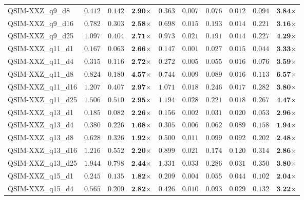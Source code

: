 \begin{table*}[t]
{\begin{tabular}{| l || r r c || r r r r r c |}
QSIM-XXZ\_q9\_d8 & $0.412$ & $0.142$ & $\textbf{2.90}$$\times$ & $0.363$ & $0.007$ & $0.076$ & $0.012$ & $0.094$ & $\textbf{3.84}$$\times$ \\
QSIM-XXZ\_q9\_d16 & $0.782$ & $0.303$ & $\textbf{2.58}$$\times$ & $0.698$ & $0.015$ & $0.193$ & $0.014$ & $0.221$ & $\textbf{3.16}$$\times$ \\
QSIM-XXZ\_q9\_d25 & $1.097$ & $0.404$ & $\textbf{2.71}$$\times$ & $0.973$ & $0.021$ & $0.191$ & $0.014$ & $0.227$ & $\textbf{4.29}$$\times$ \\
QSIM-XXZ\_q11\_d1 & $0.167$ & $0.063$ & $\textbf{2.66}$$\times$ & $0.147$ & $0.001$ & $0.027$ & $0.015$ & $0.044$ & $\textbf{3.33}$$\times$ \\
QSIM-XXZ\_q11\_d4 & $0.315$ & $0.116$ & $\textbf{2.72}$$\times$ & $0.272$ & $0.005$ & $0.055$ & $0.016$ & $0.076$ & $\textbf{3.59}$$\times$ \\
QSIM-XXZ\_q11\_d8 & $0.824$ & $0.180$ & $\textbf{4.57}$$\times$ & $0.744$ & $0.009$ & $0.089$ & $0.016$ & $0.113$ & $\textbf{6.57}$$\times$ \\
QSIM-XXZ\_q11\_d16 & $1.207$ & $0.407$ & $\textbf{2.97}$$\times$ & $1.071$ & $0.018$ & $0.246$ & $0.017$ & $0.282$ & $\textbf{3.80}$$\times$ \\
QSIM-XXZ\_q11\_d25 & $1.506$ & $0.510$ & $\textbf{2.95}$$\times$ & $1.194$ & $0.028$ & $0.221$ & $0.018$ & $0.267$ & $\textbf{4.47}$$\times$ \\
QSIM-XXZ\_q13\_d1 & $0.185$ & $0.082$ & $\textbf{2.26}$$\times$ & $0.156$ & $0.002$ & $0.031$ & $0.020$ & $0.053$ & $\textbf{2.96}$$\times$ \\
QSIM-XXZ\_q13\_d4 & $0.380$ & $0.226$ & $\textbf{1.68}$$\times$ & $0.305$ & $0.006$ & $0.062$ & $0.089$ & $0.158$ & $\textbf{1.94}$$\times$ \\
QSIM-XXZ\_q13\_d8 & $0.628$ & $0.326$ & $\textbf{1.92}$$\times$ & $0.500$ & $0.011$ & $0.099$ & $0.092$ & $0.202$ & $\textbf{2.48}$$\times$ \\
QSIM-XXZ\_q13\_d16 & $1.216$ & $0.552$ & $\textbf{2.20}$$\times$ & $0.899$ & $0.021$ & $0.174$ & $0.120$ & $0.314$ & $\textbf{2.86}$$\times$ \\
QSIM-XXZ\_q13\_d25 & $1.944$ & $0.798$ & $\textbf{2.44}$$\times$ & $1.331$ & $0.033$ & $0.286$ & $0.031$ & $0.350$ & $\textbf{3.80}$$\times$ \\
QSIM-XXZ\_q15\_d1 & $0.245$ & $0.135$ & $\textbf{1.82}$$\times$ & $0.209$ & $0.004$ & $0.055$ & $0.044$ & $0.102$ & $\textbf{2.04}$$\times$ \\
QSIM-XXZ\_q15\_d4 & $0.565$ & $0.200$ & $\textbf{2.82}$$\times$ & $0.426$ & $0.010$ & $0.093$ & $0.029$ & $0.132$ & $\textbf{3.22}$$\times$ \\

\end{tabular}}
\end{table*}
